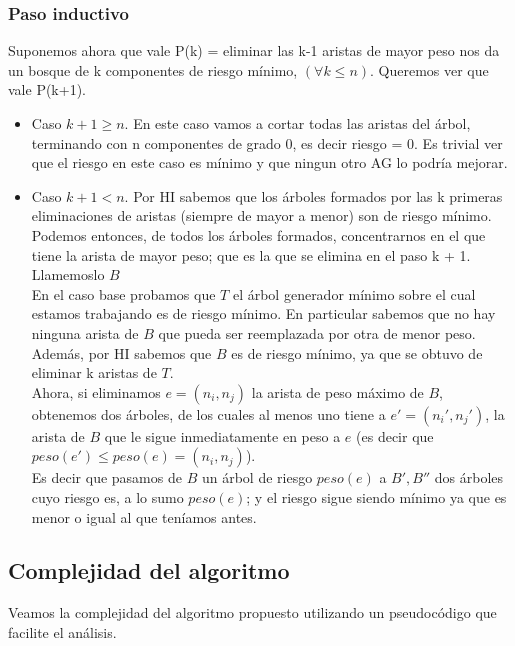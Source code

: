 \subsubsection{Paso inductivo}

Suponemos ahora que vale P(k) = eliminar las k-1 aristas de mayor peso nos da un bosque de k componentes de riesgo m\'inimo, $(\forall k \leq n)$. Queremos ver que vale P(k+1).\\

\begin{itemize}
\item Caso $k + 1 \geq n$. En este caso vamos a cortar todas las aristas del \'arbol, terminando con n componentes de grado 0, es decir riesgo = 0. Es trivial ver que el riesgo en este caso es m\'inimo y que ningun otro AG lo podr\'ia mejorar.
\item Caso $k + 1 < n$. Por HI sabemos que los \'arboles formados por las k primeras eliminaciones de aristas (siempre de mayor a menor) son de riesgo m\'inimo.\\
Podemos entonces, de todos los \'arboles formados, concentrarnos en el que tiene la arista de mayor peso; que es la que se elimina en el paso k + 1. Llamemoslo $B$\\
En el caso base probamos que $T$ el \'arbol generador m\'inimo sobre el cual estamos trabajando es de riesgo m\'inimo. En particular sabemos que no hay ninguna arista de $B$ que pueda ser reemplazada por otra de menor peso.\\
Adem\'as, por HI sabemos que $B$ es de riesgo m\'inimo, ya que se obtuvo de eliminar k aristas de $T$.\\
Ahora, si eliminamos $e = (n_i, n_j)$ la arista de peso m\'aximo de $B$, obtenemos dos \'arboles, de los cuales al menos uno tiene a $e' = (n_i', n_j')$, la arista de $B$ que le sigue inmediatamente en peso a $e$ (es decir que $peso(e') \leq peso(e) = (n_i, n_j)$).\\
Es decir que pasamos de $B$ un \'arbol de riesgo $peso(e)$ a $B', B''$ dos \'arboles cuyo riesgo es, a lo sumo $peso(e)$; y el riesgo sigue siendo m\'inimo ya que es menor o igual al que ten\'iamos antes.\\ 
\end{itemize}

\subsection{Complejidad del algoritmo}

Veamos la complejidad del algoritmo propuesto utilizando un pseudoc\'odigo que facilite el an\'alisis.

